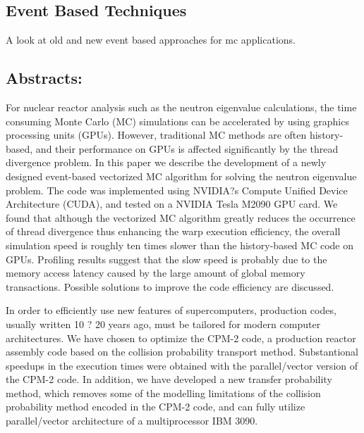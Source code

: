 \subsection{Event Based Techniques}

A look at old and new event based approaches for mc applications.

\subsection*{Abstracts:}

%

For nuclear reactor analysis such as the neutron eigenvalue calculations, the time consuming Monte Carlo (MC) simulations can be accelerated by using graphics processing units (GPUs). However, traditional MC methods are often history-based, and their performance on GPUs is affected significantly by the thread divergence problem. In this paper we describe the development of a newly designed event-based vectorized MC algorithm for solving the neutron eigenvalue problem. The code was implemented using NVIDIA?s Compute Unified Device Architecture (CUDA), and tested on a NVIDIA Tesla M2090 GPU card. We found that although the vectorized MC algorithm greatly reduces the occurrence of thread divergence thus enhancing the warp execution efficiency, the overall simulation speed is roughly ten times slower than the history-based MC code on GPUs. Profiling results suggest that the slow speed is probably due to the memory access latency caused by the large amount of global memory transactions. Possible solutions to improve the code efficiency are discussed.~\cite{liu2014comparative}

%

In order to efficiently use new features of supercomputers, production codes, usually written 10 ? 20 years ago, must be tailored for modern computer architectures. We have chosen to optimize the CPM-2 code, a production reactor assembly code based on the collision probability transport method. Substantional speedups in the execution times were obtained with the parallel/vector version of the CPM-2 code. In addition, we have developed a new transfer probability method, which removes some of the modelling limitations of the collision probability method encoded in the CPM-2 code, and can fully utilize parallel/vector architecture of a multiprocessor IBM 3090.~\cite{vujic1991vectorization}

%





